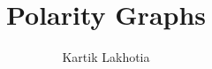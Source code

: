\documentclass[12pt]{report}
\begin{document}
\title{Polarity Graphs}
\author{Kartik Lakhotia}

 \maketitle





\end{document}
